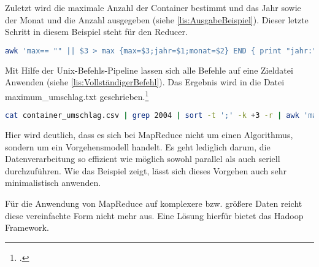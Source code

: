 Zuletzt wird die maximale Anzahl der Container bestimmt und das Jahr sowie der Monat und die Anzahl ausgegeben (siehe \autoref{lis:AusgabeBeispiel}). Dieser letzte Schritt in diesem Beispiel steht für den Reducer. \\

\begin{lstlisting}[language=bash, caption=Ausgabe des Beispielprogramms, title=\autoref*{lis:AusgabeBeispiel}: Ausgabe des Beispielprogramms\protect\footnotemark, label=lis:AusgabeBeispiel]
awk 'max== "" || $3 > max {max=$3;jahr=$1;monat=$2} END { print "jahr:" jahr; print "monat:" monat; print "anzahl:" max;}' FS=";"
\end{lstlisting}

Mit Hilfe der Unix-Befehls-Pipeline lassen sich alle Befehle auf eine Zieldatei Anwenden (siehe \autoref{lis:VollständigerBefehl}). Das Ergebnis wird in die Datei maximum\_umschlag.txt geschrieben.\footcite[Vgl.][S. 26 ff]{Wartala.2012} \\

\begin{lstlisting}[language=bash, caption=Vollständiger Befehl zur Auswertung der Beispieldaten, title=\autoref*{lis:VollständigerBefehl}: Vollständiger Befehl zur Auswertung der Beispieldaten\protect\footnotemark, label=lis:VollständigerBefehl]
cat container_umschlag.csv | grep 2004 | sort -t ';' -k +3 -r | awk 'max== "" || $3 > max {max=$3;jahr=$1;monat=$2} END { print "jahr:" jahr; print "monat:" monat; print "anzahl:" max;}' FS=";" | cat > maximum_umschlag.txt
\end{lstlisting}

Hier wird deutlich, dass es sich bei MapReduce nicht um einen Algorithmus, sondern um ein Vorgehensmodell handelt. Es geht lediglich darum, die Datenverarbeitung so effizient wie möglich sowohl parallel als auch seriell durchzuführen. Wie das Beispiel zeigt, lässt sich dieses Vorgehen auch sehr minimalistisch anwenden.

Für die Anwendung von MapReduce auf komplexere bzw. größere Daten reicht diese vereinfachte Form nicht mehr aus. Eine Lösung hierfür bietet das Hadoop Framework.



